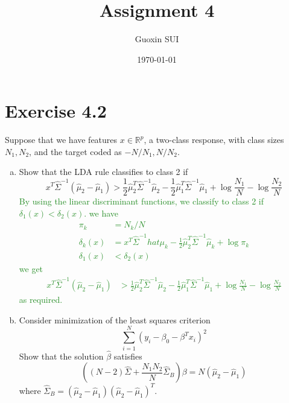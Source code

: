 \documentclass{article}
\title{Assignment 4}
\author{Guoxin SUI}
\date{\today}
\begin{document}
\maketitle

\section{Exercise 4.2}
Suppose that we have features $x \in \mathbb{R}^p$, a two-class response, with class sizes $N_1, N_2$, and the target coded as $-N/N_1, N/N_2$.

\begin{enumerate}[(a)]
    \item
    Show that the LDA rule classifies to class 2 if
        \[
            x^T \hat \Sigma^{-1} (\hat \mu_2 - \hat \mu_1) > \frac{1}{2} \hat \mu_2^T \hat \Sigma^{-1} \hat \mu_2 - \frac{1}{2} \hat \mu_1^T \hat \Sigma^{-1} \hat \mu_1 + \log \frac{N_1}{N} - \log \frac{N_2}{N}
        \]
    \textcolor{ForestGreen}{By using the linear discriminant functions, we classify to class 2 if $\delta_1(x) < \delta_2(x)$. we have \begin{align*}
            \pi_k &= N_k /N \\
            \delta_k(x) &= x^T \hat \Sigma^{-1} hat \mu_k - \frac{1}{2} \hat \mu_2^T \hat \Sigma^{-1} \hat \mu_k  + \log {\pi_k} \\
            \delta_1(x) &< \delta_2(x)
          \end{align*}
          we get \begin{align*}
            x^T \hat \Sigma^{-1} (\hat \mu_2 - \hat \mu_1) &> \frac{1}{2} \hat \mu_2^T \hat \Sigma^{-1} \hat \mu_2 - \frac{1}{2} \hat \mu_1^T \hat \Sigma^{-1} \hat \mu_1 + \log \frac{N_1}{N} - \log \frac{N_2}{N}
            \end{align*}
        as required.
    }
    \item
    Consider minimization of the least squares criterion
        \[
            \sum_{i=1}^N \left(y_i - \beta_0 - \beta^T x_i \right)^2
        \]
        Show that the solution $\hat \beta$ satisfies
        \[
            \left( (N-2) \hat \Sigma + \frac{N_1 N_2}{N} \hat \Sigma_B \right) \beta = N (\hat \mu_2 - \hat \mu_1 )
        \] where $\hat \Sigma_B = (\hat \mu_2 - \hat \mu_1) (\hat \mu_2 - \hat \mu_1)^T$.


\end{enumerate}
\end{document}
